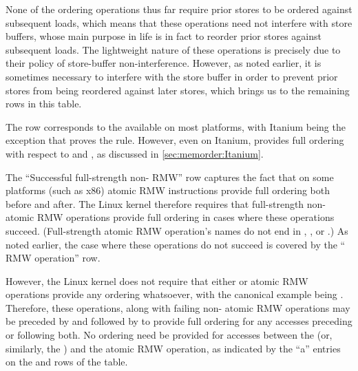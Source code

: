 {{	None of the ordering operations thus far require prior stores to be
	ordered against subsequent loads, which means that these operations
	need not interfere with store buffers, whose main purpose in life
	is in fact to reorder prior stores against subsequent loads.
	The lightweight nature of these operations is precisely due to
	their policy of store-buffer non-interference.
	However, as noted earlier, it is sometimes necessary to interfere
	with the store buffer in order to prevent prior stores from being
	reordered against later stores, which brings us to the remaining
	rows in this table.

	The  row corresponds to the 
	available on most platforms, with Itanium being the exception
	that proves the rule.
	However, even on Itanium,  provides full ordering
	with respect to  and ,
	as discussed in \cref{sec:memorder:Itanium}.

	The ``Successful full-strength non- RMW'' row captures
	the fact that on some platforms (such as x86) atomic RMW instructions
	provide full ordering both before and after.
	The Linux kernel therefore requires that full-strength non-
	atomic RMW operations provide full ordering in cases where these
	operations succeed.
	(Full-strength atomic RMW operation's names do not end in
	, , or .)
	As noted earlier, the case where these operations do not succeed
	is covered by the `` RMW operation'' row.

	However, the Linux kernel does not require that either 
	or  atomic RMW operations provide any ordering
	whatsoever, with the canonical example being .
	Therefore, these operations, along with failing non-
	atomic RMW operations may be preceded by 
	and followed by  to provide full
	ordering for any accesses preceding or following both.
	No ordering need be provided for accesses between the
	 (or, similarly, the
	) and the atomic RMW operation, as
	indicated by the ``a'' entries on the 
	and  rows of the table.

}}
